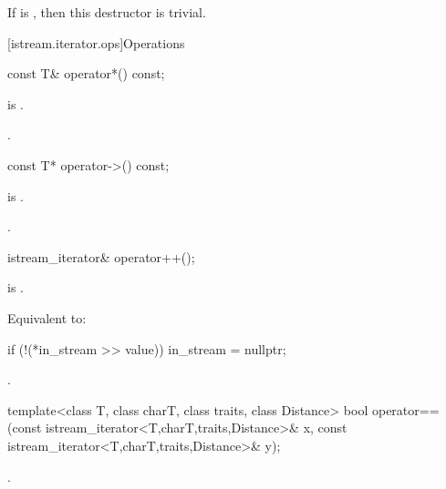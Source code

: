 \begin{itemdescr}
\pnum
\remarks
If  is ,
then this destructor is trivial.
\end{itemdescr}

[istream.iterator.ops]{Operations}

%
\begin{itemdecl}
const T& operator*() const;
\end{itemdecl}

\begin{itemdescr}
\pnum
\expects
{} is .

\pnum
\returns
{}.
\end{itemdescr}

%
\begin{itemdecl}
const T* operator->() const;
\end{itemdecl}

\begin{itemdescr}
\pnum
\expects
{} is .

\pnum
\returns
{}.
\end{itemdescr}

%
\begin{itemdecl}
istream_iterator& operator++();
\end{itemdecl}

\begin{itemdescr}
\pnum
\expects
{} is .

\pnum
\effects
Equivalent to:
\begin{codeblock}
if (!(*in_stream >> value))
  in_stream = nullptr;
\end{codeblock}

\pnum
\returns
{}.
\end{itemdescr}

%
\begin{itemdecl}
template<class T, class charT, class traits, class Distance>
  bool operator==(const istream_iterator<T,charT,traits,Distance>& x,
                  const istream_iterator<T,charT,traits,Distance>& y);
\end{itemdecl}

\begin{itemdescr}
\pnum
\returns
{}.
\end{itemdescr}

